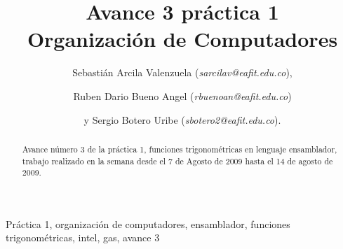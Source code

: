 \documentclass[%
	final,
	notitlepage,
	narroweqnarray,
	inline,
	twoside,
	]{ieee}
\begin{document}
\title[Avance 3 práctica 1]{%
       Avance 3 práctica 1 \\  Organización de Computadores}

\author[]{Sebastián Arcila Valenzuela (\textit{sarcilav@eafit.edu.co}),
\and{} Ruben Dario Bueno Angel (\textit{rbuenoan@eafit.edu.co})
\and{}y Sergio Botero Uribe (\textit{sbotero2@eafit.edu.co}).
}


\titletext{, \today}


\maketitle               

\begin{abstract} 
Avance número 3 de la práctica 1, funciones trigonométricas en lenguaje ensamblador, trabajo realizado en la semana desde el 7 de Agosto de 2009 hasta el 14 de agosto de 2009.
\end{abstract}

\begin{keywords}
Práctica 1, organización de computadores, ensamblador, funciones trigonométricas, intel, gas, avance 3
\end{keywords}
\end{document}
